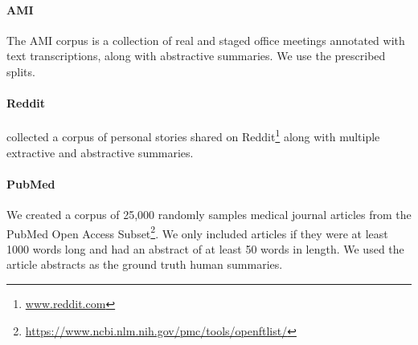 \paragraph{AMI} The AMI corpus \cite{carletta2005ami} 
is a collection of real and staged office meetings
annotated with text transcriptions, along with abstractive
summaries. We use the prescribed splits. 


\paragraph{Reddit} \citet{ouyang2017crowd} collected a corpus of personal 
    stories shared
 on Reddit\footnote{\url{www.reddit.com}} along with multiple extractive 
 and abstractive summaries. %

\paragraph{PubMed}{We created a corpus of 25,000 randomly samples 
    medical journal articles from the PubMed Open Access 
    Subset\footnote{\url{https://www.ncbi.nlm.nih.gov/pmc/tools/openftlist/}}.
    We only included articles if they were at least 1000 words long and 
    had an abstract of at least 50 words in length.
We used the article abstracts as the ground truth human summaries.}

